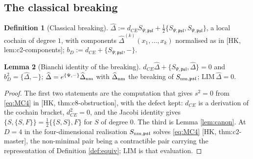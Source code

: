 \documentclass[11pt]{article}
\theoremstyle{definition}
\newtheorem{definition}{Definition}[section]
\newtheorem{lemma}[definition]{Lemma}
\numberwithin{equation}{section}
\begin{document}
\subsection{The classical breaking}

\begin{definition}[Classical breaking]
\label{def:breaking}
$\widehat\Delta:=d_{CE}S_{\Psi,\mathfrak{psl}}+\frac12\{S_{\Psi,\mathfrak{psl}},S_{\Psi,\mathfrak{psl}}\}$, a local cochain of degree $1$, with components $\widehat\Delta^{(k)}(x_1,\dots,x_k)$ normalised as in [HK, lem:c2-components]; $b_D:=d_{CE}+\{S_{\Psi,\mathfrak{psl}},-\}$.
\end{definition}

\begin{lemma}[Bianchi identity of the breaking]
\label{lem:bianchi}
$d_{CE}\widehat\Delta+\{S_{\Psi,\mathfrak{psl}},\widehat\Delta\}=0$ and $b_D^2=\{\widehat\Delta,-\}$; $\widehat\Delta=e^{\{\Psi,-\}}\widehat\Delta_{\rm nm}$ with $\widehat\Delta_{\rm nm}$ the breaking of $S_{{\rm nm},\mathfrak{psl}}$; $\mathrm{LIM}\,\widehat\Delta=0$.
\end{lemma}

\begin{proof}
The first two statements are the computation that gives $s^2=0$ from \eqref{eq:MC4} in [HK, thm:c8-obstruction], with the defect kept: $d_{CE}$ is a derivation of the cochain bracket, $d_{CE}^2=0$, and the Jacobi identity gives $\{S,\{S,F\}\}=\frac12\{\{S,S\},F\}$ for $S$ of degree $0$. The third is Lemma \ref{lem:canon}. At $D=4$ in the four-dimensional realisation $S_{{\rm nm},\mathfrak{psl}}$ solves \eqref{eq:MC4} [HK, thm:c2-master], the non-minimal pair being a contractible pair carrying the representation of Definition \ref{def:equiv}; $\mathrm{LIM}$ is that evaluation.
\end{proof}
\end{document}
